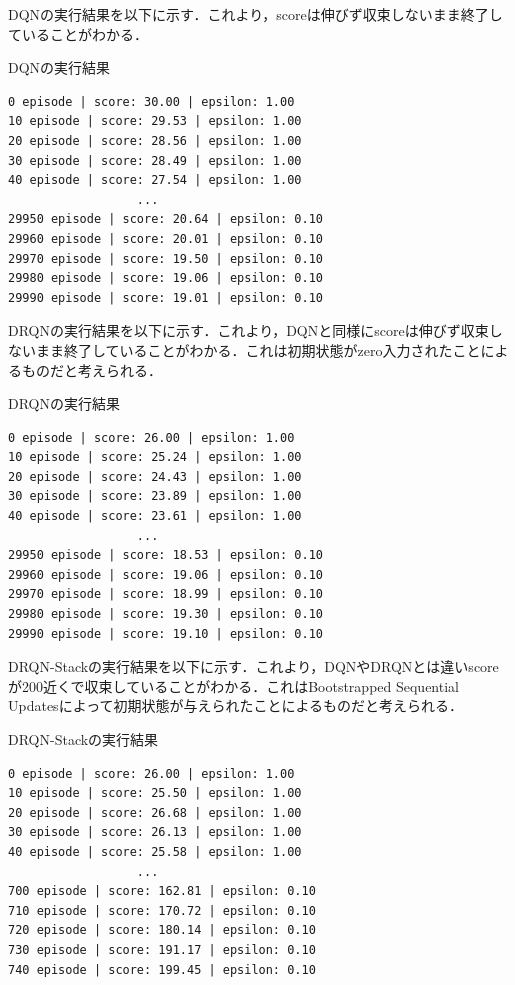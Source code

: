 \documentclass{eithesis}
\begin{document}
  DQNの実行結果を以下に示す．これより，scoreは伸びず収束しないまま終了していることがわかる．
  \begin{breakitembox}[l]{DQNの実行結果}
    \begin{verbatim}
0 episode | score: 30.00 | epsilon: 1.00
10 episode | score: 29.53 | epsilon: 1.00
20 episode | score: 28.56 | epsilon: 1.00
30 episode | score: 28.49 | epsilon: 1.00
40 episode | score: 27.54 | epsilon: 1.00
                  ...
29950 episode | score: 20.64 | epsilon: 0.10
29960 episode | score: 20.01 | epsilon: 0.10
29970 episode | score: 19.50 | epsilon: 0.10
29980 episode | score: 19.06 | epsilon: 0.10
29990 episode | score: 19.01 | epsilon: 0.10
    \end{verbatim}
  \end{breakitembox}

  DRQNの実行結果を以下に示す．これより，DQNと同様にscoreは伸びず収束しないまま終了していることがわかる．これは初期状態がzero入力されたことによるものだと考えられる．
  \begin{breakitembox}[l]{DRQNの実行結果}
    \begin{verbatim}
0 episode | score: 26.00 | epsilon: 1.00
10 episode | score: 25.24 | epsilon: 1.00
20 episode | score: 24.43 | epsilon: 1.00
30 episode | score: 23.89 | epsilon: 1.00
40 episode | score: 23.61 | epsilon: 1.00
                  ...
29950 episode | score: 18.53 | epsilon: 0.10
29960 episode | score: 19.06 | epsilon: 0.10
29970 episode | score: 18.99 | epsilon: 0.10
29980 episode | score: 19.30 | epsilon: 0.10
29990 episode | score: 19.10 | epsilon: 0.10
    \end{verbatim}
  \end{breakitembox}

  DRQN-Stackの実行結果を以下に示す．これより，DQNやDRQNとは違いscoreが200近くで収束していることがわかる．これはBootstrapped Sequential Updatesによって初期状態が与えられたことによるものだと考えられる．
  \begin{breakitembox}[l]{DRQN-Stackの実行結果}
    \begin{verbatim}
0 episode | score: 26.00 | epsilon: 1.00
10 episode | score: 25.50 | epsilon: 1.00
20 episode | score: 26.68 | epsilon: 1.00
30 episode | score: 26.13 | epsilon: 1.00
40 episode | score: 25.58 | epsilon: 1.00
                  ...
700 episode | score: 162.81 | epsilon: 0.10
710 episode | score: 170.72 | epsilon: 0.10
720 episode | score: 180.14 | epsilon: 0.10
730 episode | score: 191.17 | epsilon: 0.10
740 episode | score: 199.45 | epsilon: 0.10
    \end{verbatim}
  \end{breakitembox}
\end{document}
